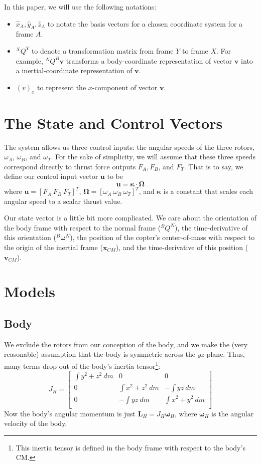\documentclass[10pt,letterpaper,final]{article}
\begin{document}
In this paper, we will use the following notations:
\begin{itemize}
\item $\hat{x}_A, \hat{y}_A, \hat{z}_A$ to notate the basis vectors for a chosen coordinate system for a frame $A$.
\item ${}^X Q^Y$ to denote a transformation matrix from frame $Y$ to frame $X$. For example, ${}^N Q^B \bm v$ transforms a body-coordinate representation of vector $\bm v$ into a inertial-coordinate representation of $\bm v$.
\item $(v)_x$ to represent the $x$-component of vector $\bm v$.
\end{itemize}

\section{The State and Control Vectors}
The system allows us three control inputs: the angular speeds of the three rotors, $\omega_A$, $\omega_B$, and $\omega_T$. For the sake of simplicity, we will assume that these three speeds correspond directly to thrust force outputs $F_A, F_B$, and $F_T$. That is to say, we define our control input vector $\bm u$ to be
\begin{equation}
\bm u = \bm \kappa \cdot \bm \Omega
\end{equation}
where $\bm u = [F_A \ F_B \ F_T]^T$, $\bm \Omega = [\omega_A \ \omega_B \ \omega_T]^T$, and $\bm \kappa$ is a constant that scales each angular speed to a scalar thrust value.

Our state vector is a little bit more complicated. We care about the orientation of the body frame with respect to the normal frame ($^B Q^N$), the time-derivative of this orientation ($^B \bm \omega^N$), the position of the copter's center-of-mass with respect to the origin of the inertial frame ($\bm{x}_{CM}$), and the time-derivative of this position ($\bm{v}_{CM}$).

\section{Models}
\subsection{Body}
We exclude the rotors from our conception of the body, and we make the (very reasonable) assumption that the body is symmetric across the $yz$-plane. Thus, many terms drop out of the body's inertia tensor\footnote{This inertia tensor is defined in the body frame with respect to the body's CM.}:
\begin{equation}
J_H =
\begin{bmatrix}
\int y^2 + z^2 \ dm & 0 & 0 \\ 
0 & \int x^2 + z^2 \ dm & -\int yz \ dm \\ 
0 & -\int yz \ dm & \int x^2 + y^2 \ dm  \\ 
\end{bmatrix}
\end{equation}
Now the body's angular momentum is just $\bm L_H = J_H \bm\omega_H$, where $\bm \omega_H$ is the angular velocity of the body.
\end{document}
